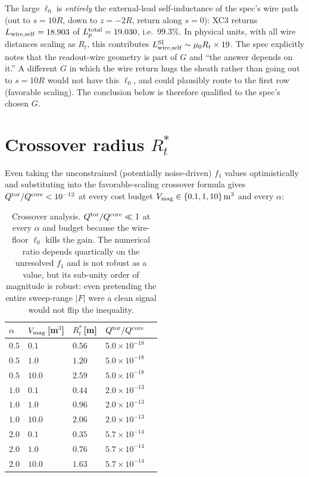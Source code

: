 \documentclass[11pt]{article}
\begin{document}
The large $\ell_0$ is \emph{entirely} the external-lead self-inductance
of the spec's wire path (out to $s=10R$, down to $z=-2R$, return along
$s\!=\!0$): XC3 returns $L_{\rm wire,self}=18.903$ of
$L_p^{\rm total}=19.030$, i.e.\ $99.3\%$.  In physical units, with all
wire distances scaling as $R_t$, this contributes
$L_{\rm wire,self}^{\rm SI}\sim\mu_0 R_t\times 19$.  The spec explicitly
notes that the readout-wire geometry is part of $G$ and ``the answer
depends on it.''  A different $G$ in which the wire return hugs the
sheath rather than going out to $s\!=\!10R$ would not have this
$\ell_0$, and could plausibly route to the first row (favorable
scaling).  The conclusion below is therefore qualified to the spec's
chosen $G$.

\section{Crossover radius $R_t^\ast$}
\label{sec:cross}

Even taking the unconstrained (potentially noise-driven) $f_1$ values
optimistically and substituting into the favorable-scaling crossover
formula gives $Q^{\rm tor}/Q^{\rm core}<10^{-12}$ at every cost budget
$V_{\rm mag}\in\{0.1,1,10\}\,\mathrm m^3$ and every $\alpha$:

\begin{table}[h]
\centering
\begin{tabular}{lllll}\toprule
$\alpha$ & $V_{\rm mag}$\,[m$^3$] & $R_t^\ast$\,[m] & $Q^{\rm tor}/Q^{\rm core}$ \\\midrule
$0.5$ & $0.1$  & $0.56$ & $5.0\!\times\!10^{-18}$ \\
$0.5$ & $1.0$  & $1.20$ & $5.0\!\times\!10^{-18}$ \\
$0.5$ & $10.0$ & $2.59$ & $5.0\!\times\!10^{-18}$ \\
$1.0$ & $0.1$  & $0.44$ & $2.0\!\times\!10^{-13}$ \\
$1.0$ & $1.0$  & $0.96$ & $2.0\!\times\!10^{-13}$ \\
$1.0$ & $10.0$ & $2.06$ & $2.0\!\times\!10^{-13}$ \\
$2.0$ & $0.1$  & $0.35$ & $5.7\!\times\!10^{-14}$ \\
$2.0$ & $1.0$  & $0.76$ & $5.7\!\times\!10^{-14}$ \\
$2.0$ & $10.0$ & $1.63$ & $5.7\!\times\!10^{-14}$ \\\bottomrule
\end{tabular}
\caption{Crossover analysis.  $Q^{\rm tor}/Q^{\rm core}\ll 1$ at every
$\alpha$ and budget because the wire-floor $\ell_0$ kills the gain.
The numerical ratio depends quartically on the unresolved $f_1$ and is
not robust as a value, but its sub-unity order of magnitude is robust:
even pretending the entire sweep-range $|F|$ were a clean signal would
not flip the inequality.}
\label{tab:crossover}
\end{table}
\end{document}
